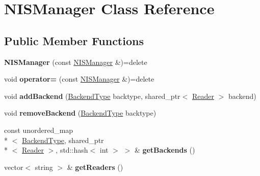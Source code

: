 \hypertarget{classNISManager}{\section{N\-I\-S\-Manager Class Reference}
\label{classNISManager}
}
\subsection*{Public Member Functions}
\begin{DoxyCompactItemize}
\item 
\hypertarget{classNISManager_a5694196f1df5f18ab9a2c8061075175e}{{\bfseries N\-I\-S\-Manager} (const \hyperlink{classNISManager}{N\-I\-S\-Manager} \&)=delete}\label{classNISManager_a5694196f1df5f18ab9a2c8061075175e}

\item 
\hypertarget{classNISManager_af191b49bf25bbf9bfd2cb5bd9cd9c434}{void {\bfseries operator=} (const \hyperlink{classNISManager}{N\-I\-S\-Manager} \&)=delete}\label{classNISManager_af191b49bf25bbf9bfd2cb5bd9cd9c434}

\item 
\hypertarget{classNISManager_a16f0f685a40a858762febd50f158b0ab}{void {\bfseries add\-Backend} (\hyperlink{nis__types_8h_acee299fbb7d897867808250049524594}{Backend\-Type} backtype, shared\-\_\-ptr$<$ \hyperlink{classnis_1_1interface_1_1Reader}{Reader} $>$ backend)}\label{classNISManager_a16f0f685a40a858762febd50f158b0ab}

\item 
\hypertarget{classNISManager_ae1ff32a0e450569a8091fb5373874d7e}{void {\bfseries remove\-Backend} (\hyperlink{nis__types_8h_acee299fbb7d897867808250049524594}{Backend\-Type} backtype)}\label{classNISManager_ae1ff32a0e450569a8091fb5373874d7e}

\item 
\hypertarget{classNISManager_a6cad1a44e5ca799fc820c40fecd5cbf2}{const unordered\-\_\-map\\*
$<$ \hyperlink{nis__types_8h_acee299fbb7d897867808250049524594}{Backend\-Type}, shared\-\_\-ptr\\*
$<$ \hyperlink{classnis_1_1interface_1_1Reader}{Reader} $>$, std\-::hash$<$ int $>$ $>$ \& {\bfseries get\-Backends} ()}\label{classNISManager_a6cad1a44e5ca799fc820c40fecd5cbf2}

\item 
\hypertarget{classNISManager_a27a3db14eb804948d4031f115d3f6234}{vector$<$ string $>$ \& {\bfseries get\-Readers} ()}\label{classNISManager_a27a3db14eb804948d4031f115d3f6234}


\end{DoxyCompactItemize}
